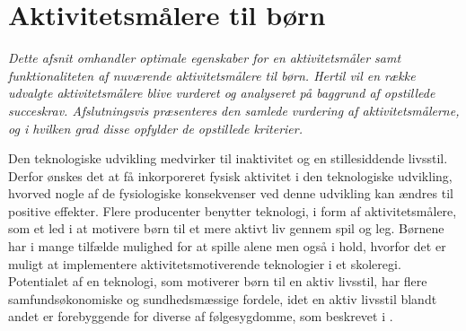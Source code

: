 \section{Aktivitetsmålere til børn} \label{tracker_intro}
\textit{Dette afsnit omhandler optimale egenskaber for en aktivitetsmåler samt funktionaliteten af nuværende aktivitetsmålere til børn. Hertil vil en række udvalgte aktivitetsmålere blive vurderet og analyseret på baggrund af opstillede succeskrav. Afslutningsvis præsenteres den samlede vurdering af aktivitetsmålerne, og i hvilken grad disse opfylder de opstillede kriterier.}
%

Den teknologiske udvikling medvirker til inaktivitet og en stillesiddende livsstil. Derfor ønskes det at få inkorporeret fysisk aktivitet i den teknologiske udvikling, hvorved nogle af de fysiologiske konsekvenser ved denne udvikling kan ændres til positive effekter. \citep{ObesityActionCoalition} Flere producenter benytter teknologi, i form af aktivitetsmålere, som et led i at motivere børn til et mere aktivt liv gennem spil og leg. Børnene har i mange tilfælde mulighed for at spille alene men også i hold, hvorfor det er muligt at implementere aktivitetsmotiverende teknologier i et skoleregi. \citep{Fuhu2015,PowerAbout2015}
Potentialet af en teknologi, som motiverer børn til en aktiv livsstil, har flere samfundsøkonomiske og sundhedsmæssige fordele, idet en aktiv livsstil blandt andet er forebyggende for diverse af følgesygdomme, som beskrevet i .


